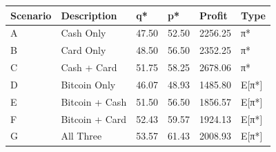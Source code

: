 \begin{tabular}{llllll}
\toprule
Scenario & Description & q* & p* & Profit & Type \\
\midrule
A & Cash Only & 47.50 & 52.50 & 2256.25 & π* \\
B & Card Only & 48.50 & 56.50 & 2352.25 & π* \\
C & Cash + Card & 51.75 & 58.25 & 2678.06 & π* \\
D & Bitcoin Only & 46.07 & 48.93 & 1485.80 & E[π*] \\
E & Bitcoin + Cash & 51.50 & 56.50 & 1856.57 & E[π*] \\
F & Bitcoin + Card & 52.43 & 59.57 & 1924.13 & E[π*] \\
G & All Three & 53.57 & 61.43 & 2008.93 & E[π*] \\
\bottomrule
\end{tabular}
